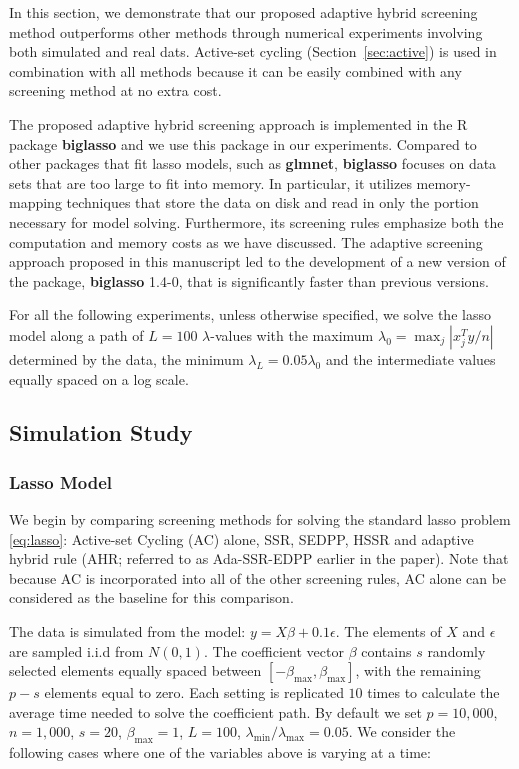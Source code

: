 \documentclass[]{interact}
\theoremstyle{plain}%
\theoremstyle{definition}
\theoremstyle{remark}
\begin{document}
In this section, we demonstrate that our proposed adaptive hybrid screening method outperforms other methods through numerical experiments involving both simulated and real dats. Active-set cycling (Section~\ref{sec:active}) is used in combination with all methods because it can be easily combined with any screening method at no extra cost.

The proposed adaptive hybrid screening approach is implemented in the R package \textbf{biglasso} and we use this package in our experiments. Compared to other packages that fit lasso models, such as \textbf{glmnet}, \textbf{biglasso} focuses on data sets that are too large to fit into memory. In particular, it utilizes memory-mapping techniques that store the data on disk and read in only the portion necessary for model solving. Furthermore, its screening rules emphasize both the computation and memory costs as we have discussed. The adaptive screening approach proposed in this manuscript led to the development of a new version of the package, \textbf{biglasso} 1.4-0, that is significantly faster than previous versions.

For all the following experiments, unless otherwise specified, we solve the lasso model along a path of $L=100$ $\lambda$-values with the maximum $\lambda_0=\max_j|x_j^Ty/n|$ determined by the data, the minimum $\lambda_L=0.05\lambda_0$ and the intermediate values equally spaced on a log scale. 

\subsection{Simulation Study}
\label{sec:sim}

\subsubsection{Lasso Model}

We begin by comparing screening methods for solving the standard lasso problem \eqref{eq:lasso}: Active-set Cycling (AC) alone, SSR, SEDPP, HSSR and adaptive hybrid rule (AHR; referred to as Ada-SSR-EDPP earlier in the paper). Note that because AC is incorporated into all of the other screening rules, AC alone can be considered as the baseline for this comparison.

The data is simulated from the model: $y=X\beta+0.1\epsilon$. The elements of $X$ and $\epsilon$ are sampled i.i.d from $N(0,1)$. The coefficient vector $\beta$ contains $s$ randomly selected elements equally spaced between $[-\beta_{\max},\beta_{\max}]$, with the remaining $p-s$ elements equal to zero. Each setting is replicated $10$ times to calculate the average time needed to solve the coefficient path. By default we set $p=10,000$, $n=1,000$, $s=20$, $\beta_{\max}=1$, $L=100$, $\lambda_{\min}/\lambda_{\max}=0.05$. We consider the following cases where one of the variables above is varying at a time:
\end{document}
